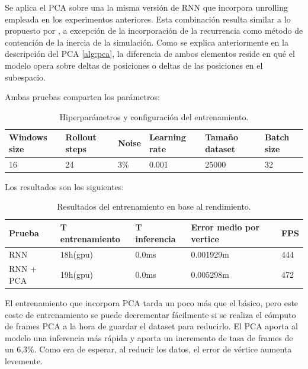 Se aplica el PCA sobre una la misma versión de RNN que incorpora unrolling empleada en los experimentos anteriores. Esta combinación resulta similar a lo propuesto por \cite{holden_subspace_2019}, a excepción de la incorporación de la recurrencia como método de contención de la inercia de la simulación. Como se explica anteriormente en la descripción del PCA \ref{alg:pca}, la diferencia de ambos elementos reside en qué el modelo opera sobre deltas de posiciones o deltas de las posiciones en el subespacio.

Ambas pruebas comparten los parámetros:
\begin{table}[H]
    \begin{center}
        \begin{tabular}{ | m{2.2cm} | m{2cm} | m{1.2cm} | m{2.1cm} | m{2.4cm} | m{2.2cm} | }
        \hline \textbf{Windows size} & \textbf{Rollout steps} & \textbf{Noise} & \textbf{Learning rate} & \textbf{Tamaño dataset} & \textbf{Batch size} \\ \hline
            16 & 24 & 3\% & 0.001 & 25000 & 32 \\ \hline
        \end{tabular}
            \end{center}
    \caption{Hiperparámetros y configuración del entrenamiento.}
    \label{tab:randomTraining}
\end{table}

Los resultados son los siguientes:
\begin{table}[H]
    \begin{center}
        \begin{tabular}{ | m{2.2cm} |  m{2.8cm} | m{2.8cm} | m{2.6cm} | m{1.2cm} |}
        \hline \textbf{Prueba} & \textbf{T entrenamiento} & \textbf{T inferencia} & \textbf{Error medio por vertice} & \textbf{FPS} \\ \hline
            RNN & 18h(gpu) & 0.0ms & 0.001929m & 444 \\ \hline
            RNN + PCA & 19h(gpu) & 0.0ms & 0.005298m & 472 \\ \hline
        \end{tabular}
    \end{center}
    \caption{Resultados del entrenamiento en base al rendimiento.}
    \label{tab:rendResults}
\end{table}

El entrenamiento que incorpora PCA tarda un poco más que el básico, pero este coste de entrenamiento se puede decrementar fácilmente si se realiza el cómputo de frames PCA a la hora de guardar el dataset para reducirlo. El PCA aporta al modelo una inferencia más rápida y aporta un incremento de tasa de frames de un 6,3\%. Como era de esperar, al reducir los datos, el error de vértice aumenta levemente.

